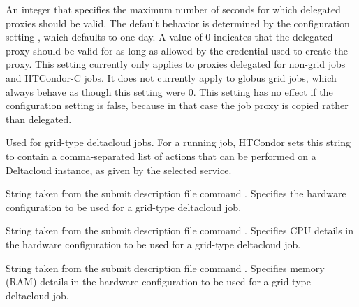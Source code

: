 \begin{description}
\item[\AdAttr{DelegateJobGSICredentialsLifetime}:]   
An integer that specifies the maximum number of seconds for which
delegated proxies should be valid.  The default behavior is determined
by the configuration
setting , which
defaults to one day.  A value of 0 indicates that the delegated proxy
should be valid for as long as allowed by the credential used to
create the proxy.  This setting currently only applies to proxies
delegated for non-grid jobs and HTCondor-C jobs.  It does not currently
apply to globus grid jobs, which always behave as though this setting
were 0.  This setting has no effect if the configuration
setting  is false, because in
that case the job proxy is copied rather than delegated.

\item[\AdAttr{DeltacloudAvailableActions}:] 
Used for grid-type deltacloud jobs.
For a running job,
HTCondor sets this string to contain a comma-separated list of actions
that can be performed on a Deltacloud instance, 
as given by the selected service.

\item[\AdAttr{DeltacloudHardwareProfile}:] 
String taken from the submit description file command
. Specifies the
hardware configuration to be used for a grid-type deltacloud
job.

\item[\AdAttr{DeltacloudHardwareProfileCpu}:] 
String taken from the submit description file command
. Specifies CPU
details in the hardware configuration to be used for a grid-type
deltacloud job.

\item[\AdAttr{DeltacloudHardwareProfileMemory}:] 
String taken from the submit description file command
. Specifies memory (RAM)
details in the hardware configuration to be used for a grid-type
deltacloud job.


\end{description}
